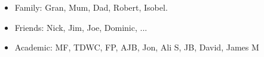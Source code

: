 \begin{acknowledgements}
    \begin{itemize}
        \item Family: Gran, Mum, Dad, Robert, Isobel.
        \item Friends: Nick, Jim, Joe, Dominic, ...
        \item Academic: MF, TDWC, FP, AJB, Jon, Ali S, JB, David, James M
    \end{itemize}
\end{acknowledgements}
